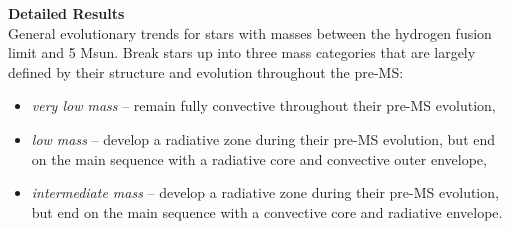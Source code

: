 \textbf{Detailed Results} \\
General evolutionary trends for stars with masses between the hydrogen fusion limit and 5 Msun. Break stars up into three mass categories that are largely defined by their structure and evolution throughout the pre-MS: 
\begin{itemize}
 \item[] {\it very low mass} -- remain fully convective throughout their pre-MS evolution,
 \item[] {\it low mass} -- develop a radiative zone during their pre-MS evolution, but end on the main sequence with a radiative core and convective outer envelope,
 \item[] {\it intermediate mass} -- develop a radiative zone during their pre-MS evolution, but end on the main sequence with a convective core and radiative envelope.
 \
\end{itemize}
